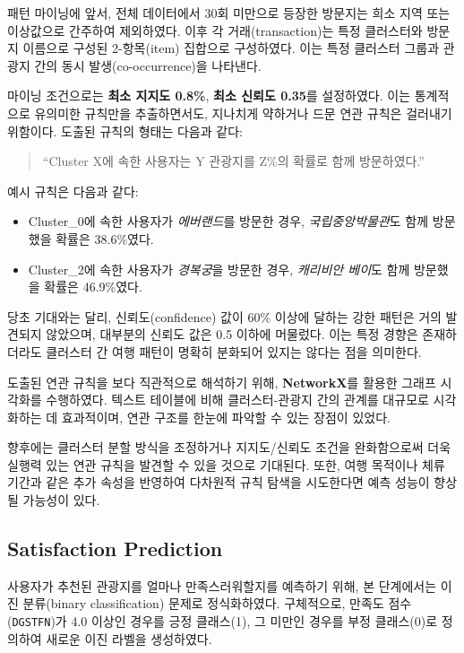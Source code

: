 \documentclass[sigconf]{acmart}
\begin{document}
\begin{CJK}{UTF8}{mj}
패턴 마이닝에 앞서, 전체 데이터에서 30회 미만으로 등장한 방문지는 희소 지역 또는 이상값으로 간주하여 제외하였다. 이후 각 거래(transaction)는 특정 클러스터와 방문지 이름으로 구성된 2-항목(item) 집합으로 구성하였다. 이는 특정 클러스터 그룹과 관광지 간의 동시 발생(co-occurrence)을 나타낸다.

마이닝 조건으로는 \textbf{최소 지지도 0.8\%}, \textbf{최소 신뢰도 0.35}를 설정하였다. 이는 통계적으로 유의미한 규칙만을 추출하면서도, 지나치게 약하거나 드문 연관 규칙은 걸러내기 위함이다. 도출된 규칙의 형태는 다음과 같다:  
\begin{quote}
    “Cluster X에 속한 사용자는 Y 관광지를 Z\%의 확률로 함께 방문하였다.”
\end{quote}

예시 규칙은 다음과 같다:
\begin{itemize}
  \item Cluster\_0에 속한 사용자가 \textit{에버랜드}를 방문한 경우, \textit{국립중앙박물관}도 함께 방문했을 확률은 38.6\%였다.
  \item Cluster\_2에 속한 사용자가 \textit{경복궁}을 방문한 경우, \textit{캐리비안 베이}도 함께 방문했을 확률은 46.9\%였다.
\end{itemize}

당초 기대와는 달리, 신뢰도(confidence) 값이 60\% 이상에 달하는 강한 패턴은 거의 발견되지 않았으며, 대부분의 신뢰도 값은 0.5 이하에 머물렀다. 이는 특정 경향은 존재하더라도 클러스터 간 여행 패턴이 명확히 분화되어 있지는 않다는 점을 의미한다.

도출된 연관 규칙을 보다 직관적으로 해석하기 위해, \textbf{NetworkX}를 활용한 그래프 시각화를 수행하였다. 텍스트 테이블에 비해 클러스터-관광지 간의 관계를 대규모로 시각화하는 데 효과적이며, 연관 구조를 한눈에 파악할 수 있는 장점이 있었다.

향후에는 클러스터 분할 방식을 조정하거나 지지도/신뢰도 조건을 완화함으로써 더욱 실행력 있는 연관 규칙을 발견할 수 있을 것으로 기대된다. 또한, 여행 목적이나 체류 기간과 같은 추가 속성을 반영하여 다차원적 규칙 탐색을 시도한다면 예측 성능이 향상될 가능성이 있다.


\subsection{Satisfaction Prediction}

사용자가 추천된 관광지를 얼마나 만족스러워할지를 예측하기 위해, 본 단계에서는 이진 분류(binary classification) 문제로 정식화하였다. 구체적으로, 만족도 점수(\texttt{DGSTFN})가 4.0 이상인 경우를 긍정 클래스(1), 그 미만인 경우를 부정 클래스(0)로 정의하여 새로운 이진 라벨을 생성하였다.


\end{CJK}
\end{document}
